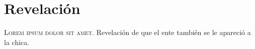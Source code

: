 

\chapter{Revelación}
\lettrine{L}{orem ipsum dolor sit amet}. Revelación de que el ente también se le apareció a la chica.